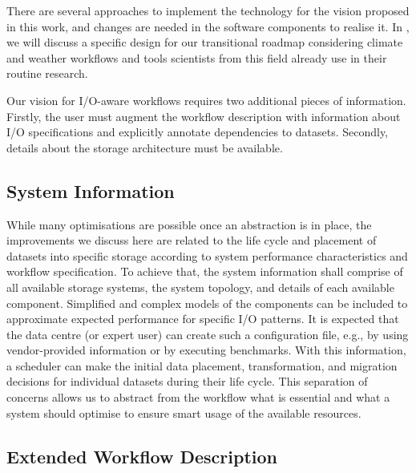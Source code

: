 \documentclass{superfri}
\begin{document}
There are several approaches to implement the technology for the vision proposed in this work, and changes are needed in the software components to realise it.
In , we will discuss a specific design for our transitional roadmap considering climate and weather workflows and tools scientists from this field already use in their routine research.

Our vision for I/O-aware workflows requires two additional pieces of information.
Firstly, the user must augment the workflow description with information about I/O specifications and explicitly annotate dependencies to datasets.
Secondly, details about the storage architecture must be available.

\subsection{System Information}

While many optimisations are possible once an abstraction is in place, the improvements we discuss here are related to the life cycle and placement of datasets into specific storage according to system performance characteristics and workflow specification.
To achieve that, the system information shall comprise of all available storage systems, the system topology, and details of each available component.
Simplified and complex models of the components can be included to approximate expected performance for specific I/O patterns.
It is expected that the data centre (or expert user) can create such a configuration file, e.g., by using vendor-provided information or by executing benchmarks.
With this information, a scheduler can make the initial data placement, transformation, and migration decisions for individual datasets during their life cycle.
This separation of concerns allows us to abstract from the workflow what is essential and what a system should optimise to ensure smart usage of the available resources.

\subsection{Extended Workflow Description}
\end{document}
